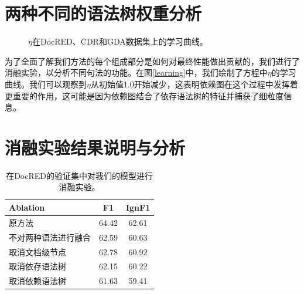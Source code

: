\documentclass[bachelor]{thesis-uestc}
\begin{document}
\section{两种不同的语法树权重分析}\label{sec:weight}
\begin{figure}[!t]
    \caption{$\eta$在DocRED、CDR和GDA数据集上的学习曲线。}
\end{figure}\label{learning}
为了全面了解我们方法的每个组成部分是如何对最终性能做出贡献的，我们进行了消融实验，以分析不同句法的功能。在图\ref{learning}中，我们绘制了方程中$\eta$的学习曲线。我们可以观察到$\eta$从初始值1.0开始减少，这表明依赖图在这个过程中发挥着更重要的作用，这可能是因为依赖图结合了依存语法树的特征并捕获了细粒度信息。 \par

\section{消融实验结果说明与分析}\label{sec:inter}

\begin{table}[]
    \begin{tabular}{llc}
    \hline
    Ablation              & \multicolumn{1}{c}{F1} & \multicolumn{1}{l}{IgnF1} \\ \hline
    原方法             & 64.42                  & 62.61                     \\ 
    不对两种语法进行融合   & 62.59                  & 60.63                     \\
    取消文档级节点 & 62.78                   & 60.92                     \\
    取消依存语法树 & 62.15                  & 60.22                     \\ 
    取消依赖语法树   & 61.63                  & 59.41                     \\
    \hline
    \end{tabular}
    \caption{在DocRED的验证集中对我们的模型进行消融实验。}
\end{table}\label{ablation}
\end{document}
